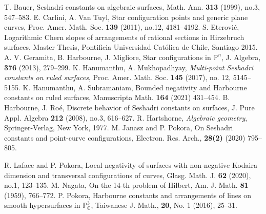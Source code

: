 \documentclass[12pt,reqno]{amsart}
\theoremstyle{plain}
\numberwithin{equation}{section}
\theoremstyle{definition}
\begin{document}
	
	
	\begin{thebibliography}{100}
	 T. Bauer, Seshadri constants on algebraic surfaces, Math. Ann. \textbf{313} (1999), no.3, 547--583.
	 E. Carlini, A. Van Tuyl, Star configuration points and generic plane curves, Proc. Amer. Math. Soc. \textbf{139} (2011), no.12, 4181--4192.
	 S. Eterovi\'c, Logarithmic Chern slopes of arrangements of rational sections in Hirzebruch surfaces,
		Master Thesis, Pontificia Universidad Cat\'olica de Chile, Santiago 2015.
		 A. V. Geramita, B. Harbourne, J. Migliore, Star configurations in $\mathbb{P}^n$, J. Algebra, \textbf{376} (2013), 279--299.
		 K. Hanumanthu, A. Mukhopadhyay, {\it Multi-point Seshadri constants on ruled surfaces}, Proc. Amer. Math. Soc. \textbf{145} (2017), no. 12, 5145--5155.
		 K. Hanumanthu, A. Subramaniam, Bounded negativity and Harbourne constants on ruled surfaces, Manuscripta Math. \textbf{164} (2021) 431--454. 
		 B. Harbourne, J. Ro\'e,
Discrete behavior of Seshadri constants on surfaces, J. Pure Appl. Algebra \textbf{212} (2008), no.3, 616--627.
		 R. Hartshorne, {\it Algebraic geometry},
		Springer-Verlag, New York, 1977.
		M. Janasz and P. Pokora, On Seshadri constants and point-curve configurations, Electron. Res. Arch., \textbf{28(2)} (2020)  795--805.

		
			 R. Laface and P. Pokora, 
		Local negativity of surfaces with non-negative Kodaira dimension and transversal configurations of curves, 
Glasg. Math. J. \textbf{62} (2020), no.1, 123--135.	
		 M. Nagata, On the 14-th problem of Hilbert, Am. J. Math. \textbf{81} (1959), 766--772.
	P. Pokora, Harbourne constants and arrangements of lines on smooth hypersurfaces in
$\mathbb{P}_{\mathbb{C}}^3$,  Taiwanese J. Math., \textbf{20}, No. 1 (2016), 25--31.  
		

\end{thebibliography}
\end{document}
